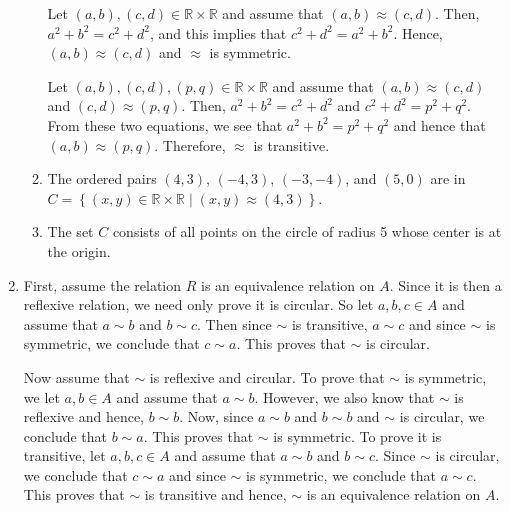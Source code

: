\begin{enumerate}
\begin{enumerate}
Let $\left( {a, b} \right), \left( {c, d} \right) \in \mathbb{R} \times \mathbb{R}$ and assume that $\left( {a, b} \right) \approx \left( {c, d} \right)$.  Then, $a^2  + b^2  = c^2  + d^2 $, and this implies that $c^2  + d^2  = a^2  + b^2 $.  Hence, 
$\left( {a, b} \right) \approx \left( {c, d} \right)$ and $\approx$ is symmetric.

Let $\left( {a, b} \right), \left( {c, d} \right), \left( {p, q} \right) \in \mathbb{R} \times \mathbb{R}$ and assume that $\left( {a, b} \right) \approx \left( {c, d} \right)$ and 
$\left( {c, d} \right) \approx \left( {p, q} \right)$.  Then, $a^2  + b^2  = c^2  + d^2 $ and 
$c^2  + d^2  = p^2  + q^2 $.  From these two equations, we see that 
$a^2  + b^2  = p^2  + q^2 $ and hence that $\left( {a, b} \right) \approx \left( {p, q} \right)$.  Therefore, $\approx$ is transitive.

\item The ordered pairs $\left( 4, 3 \right)$, $\left( -4, 3 \right)$, 
$\left( -3, -4 \right)$, and $\left( 5, 0 \right)$ are in \\
$C = \left\{ { {\left( {x, y} \right) \in \mathbb{R} \times \mathbb{R} } \mid                 \left( {x, y} \right) \approx \left( {4, 3} \right)} \right\}$.

\item The set $C$ consists of all points on the circle of radius 5 whose center is at the origin.
\end{enumerate}



\item First, assume the relation $R$ is an equivalence relation on $A$.  Since it is then a reflexive relation, we need only prove it is circular.  So let $a, b, c \in A$ and assume that 
$a \sim b$ and $b \sim c$.  Then since $\sim$ is transitive, $a \sim c$ and since $\sim$ is symmetric, we conclude that $c \sim a$.  This proves that $\sim$ is circular.

Now assume that $\sim$ is reflexive and circular.  To prove that $\sim$ is symmetric, we let 
$a, b \in A$ and assume that $a \sim b$.  However, we also know that $\sim$ is reflexive and hence, $b \sim b$.  Now, since $a \sim b$ and $b \sim b$ and $\sim$ is circular, we conclude that $b \sim a$.  This proves that $\sim$ is symmetric.  To prove it is transitive, let 
$a, b, c \in A$ and assume that $a \sim b$ and $b \sim c$.  Since $\sim$ is circular, we conclude that $c \sim a$ and since $\sim$ is symmetric, we conclude that $a \sim c$.  This proves that $\sim$ is transitive and hence, $\sim$ is an equivalence relation on $A$.




\end{enumerate}
